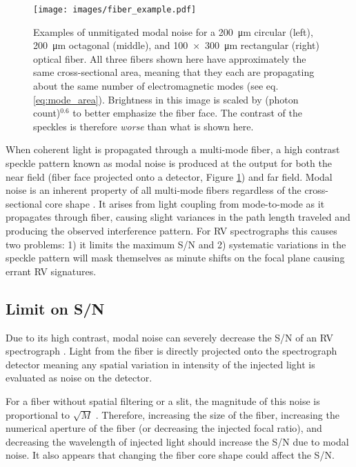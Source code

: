 \documentclass[twocolumn]{emulateapj}
\begin{document}
\begin{figure}
\centering
	\texttt{[image: images/fiber\_example.pdf]}
	\caption{Examples of unmitigated modal noise for a \SI{200}{\micro\meter} circular (left), \SI{200}{\micro\meter} octagonal (middle), and \SI{100x300}{\micro\meter} rectangular (right) optical fiber. All three fibers shown here have approximately the same cross-sectional area, meaning that they each are propagating about the same number of electromagnetic modes (see eq. \ref{eq:mode_area}). Brightness in this image is scaled by (photon count)$^{0.6}$ to better emphasize the fiber face. The contrast of the speckles is therefore \textit{worse} than what is shown here.}
\label{fig:fiber_example}
\end{figure}

When coherent light is propagated through a multi-mode fiber, a high contrast speckle pattern known as modal noise is produced at the output for both the near field (fiber face projected onto a detector, Figure \ref{fig:fiber_example}) and far field. Modal noise is an inherent property of all multi-mode fibers regardless of the cross-sectional core shape \citep{Sablowski2015}. It arises from light coupling from mode-to-mode as it propagates through fiber, causing slight variances in the path length traveled and producing the observed interference pattern. For RV spectrographs this causes two problems: 1) it limits the maximum S/N and 2) systematic variations in the speckle pattern will mask themselves as minute shifts on the focal plane causing errant RV signatures.

\subsection{Limit on S/N}

Due to its high contrast, modal noise can severely decrease the S/N of an RV spectrograph \citep{Epworth1978, Baudrand2001, Lemke2011}. Light from the fiber is directly projected onto the spectrograph detector meaning any spatial variation in intensity of the injected light is evaluated as noise on the detector.

For a fiber without spatial filtering or a slit, the magnitude of this noise is proportional to $\sqrt{M}$ \citep{Goodman1981}. Therefore, increasing the size of the fiber, increasing the numerical aperture of the fiber (or decreasing the injected focal ratio), and decreasing the wavelength of injected light should increase the S/N due to modal noise. It also appears that changing the fiber core shape could affect the S/N.
\end{document}
